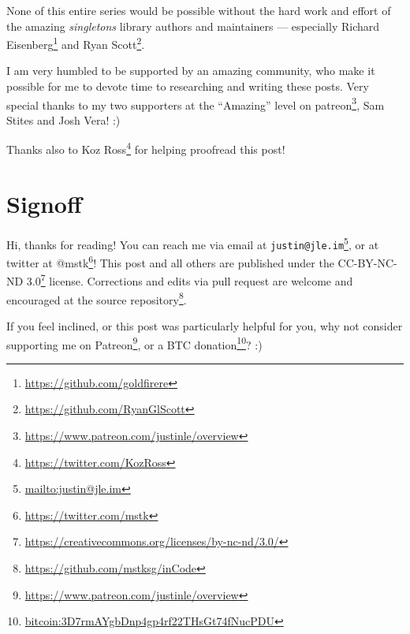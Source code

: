 \documentclass[]{article}
\renewcommand{\href}[2]{#2\footnote{\url{#1}}}
\begin{document}
None of this entire series would be possible without the hard work and effort of
the amazing \emph{singletons} library authors and maintainers --- especially
\href{https://github.com/goldfirere}{Richard Eisenberg} and
\href{https://github.com/RyanGlScott}{Ryan Scott}.

I am very humbled to be supported by an amazing community, who make it possible
for me to devote time to researching and writing these posts. Very special
thanks to my two supporters at the ``Amazing'' level on
\href{https://www.patreon.com/justinle/overview}{patreon}, Sam Stites and Josh
Vera! :)

Thanks also to \href{https://twitter.com/KozRoss}{Koz Ross} for helping
proofread this post!

\section{Signoff}\label{signoff}

Hi, thanks for reading! You can reach me via email at
\href{mailto:justin@jle.im}{\nolinkurl{justin@jle.im}}, or at twitter at
\href{https://twitter.com/mstk}{@mstk}! This post and all others are published
under the \href{https://creativecommons.org/licenses/by-nc-nd/3.0/}{CC-BY-NC-ND
3.0} license. Corrections and edits via pull request are welcome and encouraged
at \href{https://github.com/mstksg/inCode}{the source repository}.

If you feel inclined, or this post was particularly helpful for you, why not
consider \href{https://www.patreon.com/justinle/overview}{supporting me on
Patreon}, or a \href{bitcoin:3D7rmAYgbDnp4gp4rf22THsGt74fNucPDU}{BTC donation}?
:)
\end{document}
